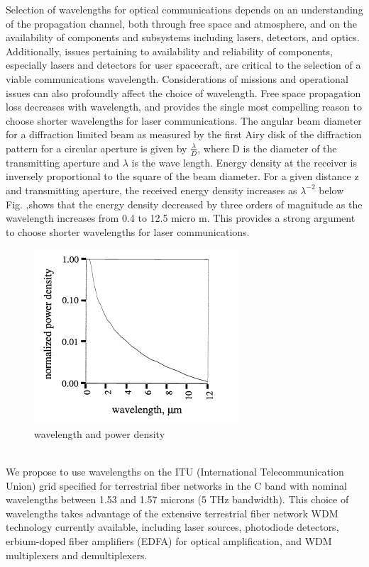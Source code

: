 Selection of wavelengths for optical communications depends on an understanding of the propagation channel, both through free space and atmosphere, and on the availability of components and subsystems including lasers, detectors, and optics. Additionally, issues pertaining to availability and reliability of components, especially lasers and detectors for user spacecraft, are critical to the selection of a viable communications wavelength. Considerations of missions and operational issues can also profoundly affect the choice of wavelength. Free space propagation loss decreases with wavelength, and provides the single most compelling reason to choose shorter wavelengths for laser communications. The angular beam diameter for a diffraction limited beam as measured by the first Airy disk of the diffraction pattern for a circular aperture is given by $\tfrac{\lambda}{D}$, where D is the diameter of the transmitting aperture and $\lambda$ is the wave length. Energy density at the receiver is inversely proportional to the square of the beam diameter. For a given distance z and transmitting aperture, the received energy density increases as $\lambda^{-2}$ below Fig. ,shows that the energy density decreased by three orders of magnitude as the wavelength increases from 0.4 to 12.5 micro m. This provides a strong argument to choose shorter wavelengths for laser communications.
\begin{figure}[htb]
\begin{center}
\includegraphics[width=0.7\columnwidth]{figures/laser-communication/bh4.jpg}
\caption{wavelength and power density}
\end{center}
\end{figure}
\\
We propose to use wavelengths on the ITU (International Telecommunication Union) grid specified for terrestrial fiber networks in the C band with nominal wavelengths between 1.53 and 1.57 microns (5 THz bandwidth). This choice of wavelengths takes advantage of the extensive terrestrial fiber network WDM technology currently available, including laser sources, photodiode detectors, erbium-doped fiber amplifiers (EDFA) for optical amplification, and WDM multiplexers and demultiplexers. 

